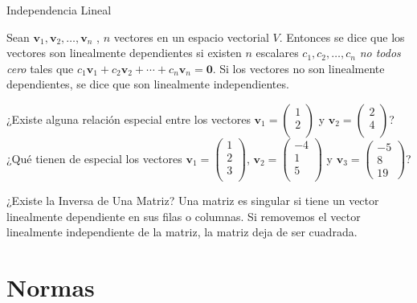 \begin{frame}{Independencia Lineal}
  

      Sean $\bm{v}_1 , \bm{v}_2 , \ldots , \bm{v}_n$ , $n$ vectores en un espacio vectorial $V$. Entonces se dice que los vectores son \alert{linealmente dependientes} si existen $n$ escalares $c_1 , c_2 ,\ldots, c_n$ \emph{no todos cero} tales que $c_1 \bm{v}_1 + c_2 \bm{v}_2 + \cdots + c_n\bm{v}_n = \bm{0}$.  Si los vectores no son linealmente dependientes, se dice que son \alert{linealmente independientes}.


    ¿Existe alguna relación especial entre los vectores $\bm{v}_1 =
    \begin{pmatrix}
      1\\
      2\\
    \end{pmatrix}
$ y $\bm{v}_2 =
    \begin{pmatrix}
      2\\
      4\\
    \end{pmatrix}$? ¿Qué tienen de especial los vectores $\bm{v}_1 =
    \begin{pmatrix}
      1\\
      2\\
      3\\
    \end{pmatrix}
$, $\bm{v}_2 =
    \begin{pmatrix}
      -4\\
      1\\
5\\
    \end{pmatrix}$ y $\bm{v}_3 =
    \begin{pmatrix}
      -5\\
      8\\
19
    \end{pmatrix}$?
\end{frame}

\begin{frame}{¿Existe la Inversa de Una Matriz?}
  Una matriz es singular si tiene un vector linealmente dependiente en sus filas o columnas. Si removemos el vector linealmente independiente de la matriz, la matriz deja de ser cuadrada.
  
  
\end{frame}

\section{Normas}
\label{sec:norms}


